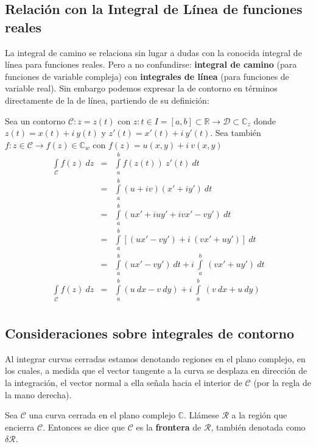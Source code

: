\documentclass[12pt]{article}
\theoremstyle{definition}
\theoremstyle{theorem}
\theoremstyle{corolary}
\begin{document}
\subsection{Relaci\'on con la Integral de L\'inea de funciones reales}
La integral de camino se relaciona sin lugar a dudas con la conocida integral de l\'inea para funciones reales. Pero a no confundirse: \textbf{integral de camino} (para funciones de variable compleja) con \textbf{integrales de l\'inea} (para funciones de variable real). Sin embargo podemos expresar la de contorno en t\'erminos directamente de la de l\'inea, partiendo de su definici\'on:

Sea un contorno $\mathcal{C}: z = z(t)$ con $z: t\in I=[a,b]\subset \mathbb{R}\rightarrow \mathcal{D}\subset \mathbb{C}_z$ donde $z(t)=x(t)+i\ y(t)$ y $z'(t) = x'(t) + i\ y'(t)$. Sea tambi\'en $f: z\in \mathcal{C} \rightarrow f(z)\in \mathbb{C}_w$ con $f(z)=u(x, y)+i\ v(x, y)$
\begin{eqnarray*}
\int\limits_{\mathcal{C}}f(z)\ dz &=& \int\limits_a^b f(z(t))\ z'(t)\ dt\\
 &=& \int\limits_a^b (u + iv)(x' + iy')\ dt\\
 &=& \int\limits_a^b (ux' + iuy' + ivx' - vy')\ dt\\
 &=& \int\limits_a^b [(ux' - vy') + i\ ( vx' + uy')]\ dt\\
 &=& \int\limits_a^b (ux' - vy')\ dt + i\ \int\limits_a^b \ ( vx' + uy')\ dt\\
\int\limits_{\mathcal{C}}f(z)\ dz  &=& \int\limits_a^b (u\ dx - v\ dy) + i\ \int\limits_a^b \ ( v\ dx + u\ dy)\\
\end{eqnarray*}

\subsection{Consideraciones sobre integrales de contorno}
Al integrar curvas cerradas estamos denotando regiones en el plano complejo, en los cuales, a medida que el vector tangente a la curva se desplaza en direcci\'on de la integraci\'on, el vector normal a ella se\~nala hacia el interior de $\mathcal{C}$ (por la regla de la mano derecha).

Sea $\mathcal{C}$ una curva cerrada en el plano complejo $\mathbb{C}$. Ll\'amese $\mathcal{R}$ a la regi\'on que encierra $\mathcal{C}$. Entonces se dice que $\mathcal{C}$ es la \textbf{frontera} de $\mathcal{R}$, tambi\'en denotada como $\delta\mathcal{R}$.
\end{document}
